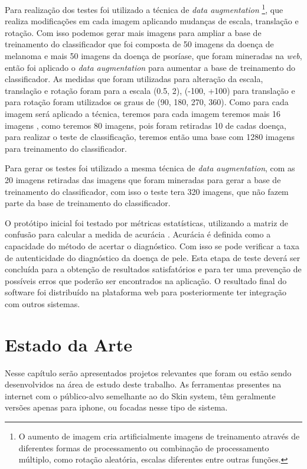 \documentclass[openright]{ifrs} %
\begin{document}
Para realização dos testes foi utilizado a técnica de \textit{data augmentation} \footnote{O aumento de imagem cria artificialmente imagens de treinamento 
através de diferentes formas de processamento ou combinação 
de processamento múltiplo, como rotação aleatória, escalas diferentes entre outras funções. }, 
que realiza  modificações em cada imagem aplicando mudanças de escala, translação e rotação. Com isso podemos gerar mais imagens para ampliar a base de treinamento do classificador
que foi composta de 50 imagens da doença de melanoma e mais 50 imagens da doença de psoríase, 
que foram  mineradas na \textit{web}, então foi aplicado o \textit{data augmentation} para aumentar a base de treinamento 
do classificador. As medidas que foram utilizadas para alteração da escala, translação e rotação foram
para a escala (0.5, 2), (-100, +100) para translação  e para rotação 
foram utilizados os graus de (90,  180, 270, 360). Como para cada imagem será aplicado a técnica, teremos
para cada imagem  teremos mais  16 imagens , como teremos 80 imagens, pois foram retiradas 10 de cadas doença,
para realizar o teste de classificação, teremos então uma base com  1280 imagens para treinamento
do classificador.


Para gerar os testes foi utilizado a mesma técnica de \textit{data augmentation},
com as 20 imagens retiradas das imagens que foram mineradas para gerar a base de treinamento do classificador,
com isso o teste tera 320 imagens, que não fazem parte 
da base de treinamento do classificador.
  


O protótipo inicial foi testado por métricas estatísticas, utilizando a matriz de confusão para calcular a medida de acurácia \cite{medicinabaseadaemevidencias}. Acurácia é definida como a capacidade do método de acertar o diagnóstico. Com isso se pode verificar a taxa de autenticidade do diagnóstico da doença de pele. Esta etapa de teste deverá ser concluída para a obtenção de resultados satisfatórios e para ter uma prevenção de possíveis erros que poderão ser encontrados na aplicação. O resultado final do software foi  distribuído na plataforma web para posteriormente ter integração com outros sistemas.


\chapter{Estado da Arte}
Nesse capítulo serão apresentados projetos relevantes que foram ou estão sendo desenvolvidos na área de estudo deste trabalho. As ferramentas presentes na internet com o público-alvo semelhante ao do Skin system, têm geralmente versões apenas para iphone, ou focadas nesse tipo de sistema.
\end{document}
